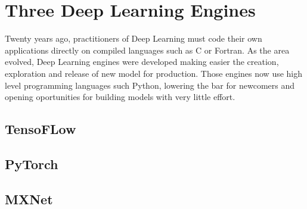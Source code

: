 \documentclass[10pt]{book}
\begin{document}
\chapter{Three Deep Learning Engines}

Twenty years ago, practitioners of Deep Learning must code their own applications directly on compiled languages such as C or Fortran. 
As the area evolved, Deep Learning engines were developed making easier the creation, exploration and release of new model for production.
Those engines now use high level programming languages such Python, lowering the bar for newcomers and opening oportunities for building models with very little effort.

\section{TensoFLow}

\section{PyTorch}

\section{MXNet}
\end{document}
